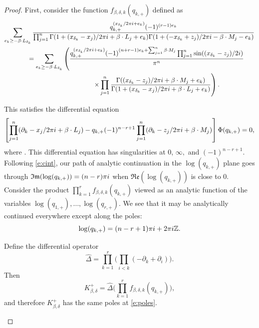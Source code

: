 \documentclass[11pt]{article}
\numberwithin{equation}{section}
\numberwithin{equation}{section}
\newcommand{\ZZ}{\mathbb{Z}}
\newcommand{\MB}{M}
\newcommand{\LB}{L}
\newcommand{\z}{z}
\newcommand{\x}{x}
\begin{document}
\begin{proof}


First, consider the function $f_{\beta, \delta, k}(q_{k, +})$ defined as
\begin{gather*}
\sum_{e_k \geq - \beta \cdot \LB_{\delta_k}}
\frac{q_{k, +}^{( \x_{\delta_k}/2\pi {\rm i} + e_k)} (-1)^{(r-1)e_k}}{
\prod_{j=1}^n\Gamma(1+(\x_{\delta_k}-\x_j)/2 \pi {\rm i}+\beta\cdot \LB_j+e_k)\Gamma(1+(-\x_{\delta_k}+\z_j)/2 \pi {\rm i}-\beta\cdot \MB_j-e_k)} \\
\qquad{}=\sum_{e_k \geq - \beta \cdot \LB_{\delta_k}}
\left( \frac{q_{k, +}^{( \x_{\delta_k}/2\pi {\rm i} + e_k)}(-1)^{(n+r-1)e_k + \sum_{j=1}^n \beta \cdot M_j }\prod_{j=1}^n \sin((\x_{\delta_k}-\z_j)/2{\rm i})
 }{ \pi^n
} \right. \\
\qquad\quad\hphantom{=\sum_{e_k \geq - \beta \cdot \LB_{\delta_k}}}{} \left.\times \prod_{j=1}^n\frac{\Gamma((\x_{\delta_k}-\z_j)/2 \pi {\rm i}+\beta\cdot \MB_j+e_k)}{\Gamma(1+(\x_{\delta_k}-\x_j)/2 \pi {\rm i}+\beta\cdot \LB_j+e_k)}\right).
\end{gather*}

This satisfies the differential equation
\[
\left[\prod_{j=1}^n (\partial_k -x_j/2 \pi {\rm i} + \beta \cdot L_j) - q_{k, +}(-1)^{n-r+1}\prod_{j=1}^n (\partial_k -z_j/2 \pi {\rm i} + \beta \cdot M_j) \right] \Phi(q_{k,+}) = 0,
\]
where . This differential equation has singularities at $0$, $\infty,$ and $(-1)^{n-r+1}$. Follo\-wing \eqref{e:cint}, our path of analytic continuation in the $\log(q_{k,+})$ plane goes through $\mathfrak{Im}(\log(q_{k,+})) = (n-r)\pi {\rm i}$ when $\mathfrak{Re}(\log(q_{k,+}))$ is close to 0.
Consider the product
$
\prod_{k=1}^r   f_{\beta, \delta, k}(q_{k, +})$
viewed as an analytic function of the variables $\log(q_{1, +}),\allowbreak \dots, \log(q_{r, +})$. We see that it may be analytically continued everywhere except along the poles:
\begin{equation} \label{e:poles} \log(q_{k,+}) = (n-r+1)\pi {\rm i} + 2 \pi {\rm i} \ZZ.\end{equation}

Define the differential operator
\[
\hat \Delta = \prod_{k=1}^r \biggl( \prod_{i< k} (-\partial_k + \partial_i) \biggr).
\]
Then
\[
K^+_{\beta, \delta} = \hat \Delta \Biggl( \prod_{k=1}^r f_{\beta, \delta, k}(q_{k, +}) \Biggr),
\]
and therefore $ K^+_{\beta, \delta}$ has the same poles at \eqref{e:poles}.


 \begin{figure}[t]\centering
{} %


\end{figure}
\end{proof}
\end{document}

